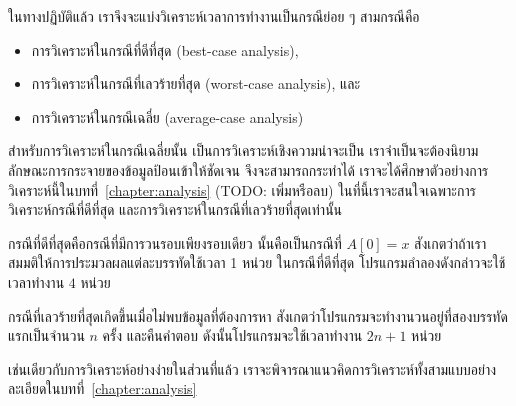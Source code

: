 ใน{\wbr}ทาง{\wbr}ปฏิบัติ{\wbr}แล้ว เรา{\wbr}จึง{\wbr}จะ{\wbr}แบ่ง{\wbr}วิเคราะห์{\wbr}เวลา{\wbr}การ{\wbr}ทำงาน{\wbr}เป็น{\wbr}กรณี{\wbr}ย่อย ๆ สาม{\wbr}กรณี{\wbr}คือ{\wbr}
\begin{itemize}
\item การ{\wbr}วิเคราะห์{\wbr}ใน{\wbr}กรณี{\wbr}ที่{\wbr}ดี{\wbr}ที่สุด (best-case analysis),
\item การ{\wbr}วิเคราะห์{\wbr}ใน{\wbr}กรณี{\wbr}ที่{\wbr}เลวร้าย{\wbr}ที่สุด (worst-case analysis), และ{\wbr}
\item การ{\wbr}วิเคราะห์{\wbr}ใน{\wbr}กรณี{\wbr}เฉลี่ย (average-case analysis)
\end{itemize}

สำหรับ{\wbr}การ{\wbr}วิเคราะห์{\wbr}ใน{\wbr}กรณี{\wbr}เฉลี่ย{\wbr}นั้น เป็น{\wbr}การ{\wbr}วิเคราะห์{\wbr}เชิง{\wbr}ความน่าจะเป็น{\wbr}
เรา{\wbr}จำเป็น{\wbr}จะ{\wbr}ต้อง{\wbr}นิยาม{\wbr}ลักษณะ{\wbr}การ{\wbr}กระจาย{\wbr}ของ{\wbr}ข้อมูล{\wbr}ป้อน{\wbr}เข้า{\wbr}ให้{\wbr}ชัดเจน จึง{\wbr}จะ{\wbr}สามารถ{\wbr}กระทำ{\wbr}ได้{\wbr}
เรา{\wbr}จะ{\wbr}ได้{\wbr}ศึกษา{\wbr}ตัวอย่าง{\wbr}การ{\wbr}วิเคราะห์{\wbr}นี้{\wbr}ใน{\wbr}บท{\wbr}ที่~\ref{chapter:analysis} (TODO:
เพิ่ม{\wbr}หรือ{\wbr}ลบ) ใน{\wbr}ที่นี้{\wbr}เรา{\wbr}จะ{\wbr}สนใจ{\wbr}เฉพาะ{\wbr}การ{\wbr}วิเคราะห์{\wbr}กรณี{\wbr}ที่{\wbr}ดี{\wbr}ที่สุด{\wbr}
และ{\wbr}การ{\wbr}วิเคราะห์{\wbr}ใน{\wbr}กรณี{\wbr}ที่{\wbr}เลวร้าย{\wbr}ที่สุด{\wbr}เท่านั้น{\wbr}

กรณี{\wbr}ที่{\wbr}ดี{\wbr}ที่สุด{\wbr}คือ{\wbr}กรณี{\wbr}ที่{\wbr}มี{\wbr}การ{\wbr}วน{\wbr}รอบ{\wbr}เพียง{\wbr}รอบ{\wbr}เดียว นั้น{\wbr}คือ{\wbr}เป็น{\wbr}กรณี{\wbr}ที่ $A[0] = x$
สังเกต{\wbr}ว่า{\wbr}ถ้า{\wbr}เรา{\wbr}สมมติ{\wbr}ให้การ{\wbr}ประมวลผล{\wbr}แต่ละ{\wbr}บรรทัด{\wbr}ใช้เวลา 1 หน่วย ใน{\wbr}กรณี{\wbr}ที่{\wbr}ดี{\wbr}ที่สุด{\wbr}
โปรแกรม{\wbr}ลำ{\wbr}ลอง{\wbr}ดังกล่าว{\wbr}จะ{\wbr}ใช้เวลา{\wbr}ทำงาน $4$ หน่วย{\wbr}

กรณี{\wbr}ที่{\wbr}เลวร้าย{\wbr}ที่สุด{\wbr}เกิด{\wbr}ขึ้น{\wbr}เมื่อ{\wbr}ไม่{\wbr}พบ{\wbr}ข้อมูล{\wbr}ที่{\wbr}ต้องการ{\wbr}หา{\wbr}
สังเกต{\wbr}ว่า{\wbr}โปรแกรม{\wbr}จะ{\wbr}ทำงาน{\wbr}วน{\wbr}อยู่{\wbr}ที่{\wbr}สอง{\wbr}บรรทัด{\wbr}แรก{\wbr}เป็น{\wbr}จำนวน $n$ ครั้ง และ{\wbr}คืนคำ{\wbr}ตอบ{\wbr}
ดังนั้น{\wbr}โปรแกรม{\wbr}จะ{\wbr}ใช้เวลา{\wbr}ทำงาน $2n + 1$ หน่วย{\wbr}

เช่นเดียวกับ{\wbr}การ{\wbr}วิเคราะห์{\wbr}อย่าง{\wbr}ง่าย{\wbr}ใน{\wbr}ส่วน{\wbr}ที่แล้ว{\wbr}
เรา{\wbr}จะ{\wbr}พิจารณา{\wbr}แนว{\wbr}คิด{\wbr}การ{\wbr}วิเคราะห์{\wbr}ทั้ง{\wbr}สาม{\wbr}แบบอย่าง{\wbr}ละเอียด{\wbr}ใน{\wbr}บท{\wbr}ที่~\ref{chapter:analysis}

